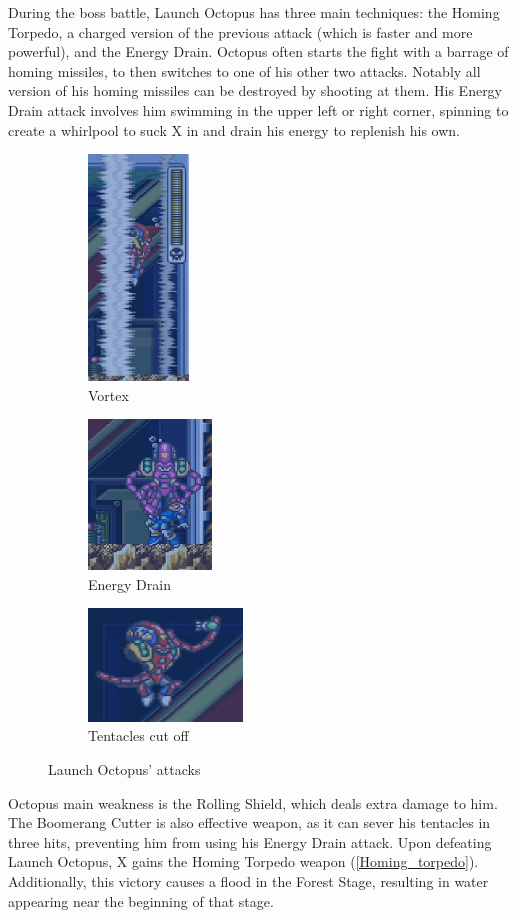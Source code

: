 During the boss battle, Launch Octopus has three main techniques: the Homing Torpedo, a charged version of the previous attack (which is faster and more powerful), and the Energy Drain.  Octopus often starts the fight with a barrage of homing missiles, to then switches to one of his other two attacks. Notably all version of his homing missiles can be destroyed by shooting at them. His Energy Drain attack involves him swimming in the upper left or right corner, spinning to create a whirlpool to suck X in and drain his energy to replenish his own.
\begin{figure}[htp]
	\ContinuedFloat
	\centering
	\begin{subfigure}[c]{0.25\textwidth}
		\centering
		\includegraphics[height=6cm]{figures/X1/Launch_octopus/Octopus_vortex.jpg}
		\caption{Vortex}
	\end{subfigure}
	\begin{subfigure}[c]{0.3\textwidth}
		\centering
		\includegraphics[height=4cm]{figures/X1/Launch_octopus/Octopus_drain.jpg}
		\caption{Energy Drain}
	\end{subfigure}
	\begin{subfigure}[c]{0.3\textwidth}
		\centering
		\includegraphics[height=3cm]{figures/X1/Launch_octopus/Octopus_cut.jpg}
		\caption{Tentacles cut off}
	\end{subfigure}
	\caption{Launch Octopus' attacks}
\end{figure}
Octopus main weakness is the Rolling Shield, which deals extra damage to him. The Boomerang Cutter is also effective weapon, as it can sever his tentacles in three hits, preventing him from using his Energy Drain attack. Upon defeating Launch Octopus, X gains the Homing Torpedo weapon (\ref{Homing_torpedo}). Additionally, this victory causes a flood in the Forest Stage, resulting in water appearing near the beginning of that stage.

